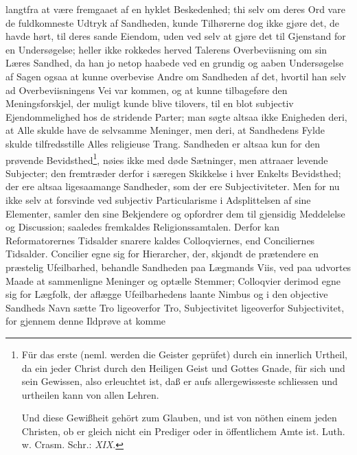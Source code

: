 \documentclass[12pt]{book}
\newcommand{\opage}[1]{\marginnote{\footnotesize\textit{[#1]}}}
\begin{document}
langtfra at være fremgaaet af en hyklet Beskedenhed; thi selv om deres Ord
vare de fuldkomneste Udtryk af Sandheden, kunde Tilhørerne dog ikke gjøre
det, de havde hørt, til deres sande Eiendom, uden ved selv at gjøre det til
Gjenstand for en Undersøgelse; heller ikke rokkedes herved Talerens
Overbeviisning
\opage{69} \setcounter{footnote}{0}%
om sin Læres Sandhed, da han jo netop haabede ved en grundig og aaben
Undersøgelse af Sagen ogsaa at kunne overbevise Andre om Sandheden af det,
hvortil han selv ad Overbeviisningens Vei var kommen, og at kunne tilbageføre
den Meningsforskjel, der muligt kunde blive tilovers, til en blot subjectiv
Ejendommelighed hos de stridende Parter; man søgte altsaa ikke Enigheden
deri, at Alle skulde have de selvsamme Meninger, men deri, at Sandhedens
Fylde skulde tilfredsstille Alles religieuse Trang. Sandheden er altsaa kun
for den prøvende Bevidsthed\footnote{Für das erste (neml. werden die Geister
geprüfet) durch ein innerlich Urtheil, da ein jeder Christ durch den Heiligen
Geist und Gottes Gnade, für sich und sein Gewissen, also erleuchtet ist, daß
er aufs allergewisseste schliessen und urtheilen kann von allen Lehren.

Und diese Gewißheit gehört zum Glauben, und ist von nöthen einem jeden
Christen, ob er gleich nicht ein Prediger oder in öffentlichem Amte ist. Luth.
w. Crasm. Schr.: \textit{XIX}.}, nøies ikke med døde Sætninger, men attraaer
levende Subjecter; den fremtræder derfor i særegen Skikkelse i hver Enkelts
Bevidsthed; der ere altsaa ligesaamange Sandheder, som der ere
Subjectiviteter. Men for nu ikke selv at forsvinde ved subjectiv
Particularisme i Adsplittelsen af sine Elementer, samler den sine Bekjendere
og opfordrer dem til gjensidig Meddelelse og Discussion; saaledes fremkaldes
Religionssamtalen. Derfor kan Reformatorernes Tidsalder snarere kaldes
Colloqviernes, end Conciliernes Tidsalder. Concilier egne sig for Hierarcher,
der, skjøndt de prætendere en præstelig Ufeilbarhed, behandle Sandheden paa
Lægmands Viis, ved paa udvortes Maade at sammenligne Meninger og optælle
Stemmer; Colloqvier derimod egne sig for Lægfolk, der aflægge Ufeilbarhedens
laante Nimbus og i den objective Sandheds Navn sætte Tro ligeoverfor Tro,
Subjectivitet ligeoverfor Subjectivitet, for gjennem denne Ildprøve at komme
\end{document}
